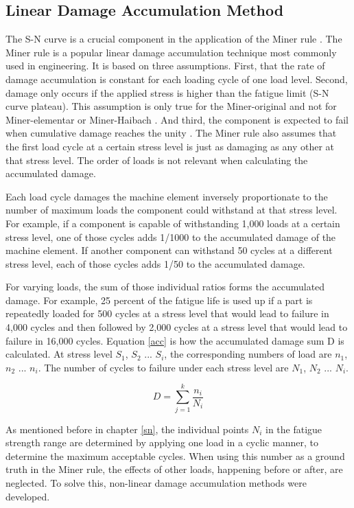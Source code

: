 \subsection{Linear Damage Accumulation Method}\label{LAD}
The S-N curve is a crucial component in the application of the Miner rule \cite{MinerOG, Subramanyan}. The Miner rule is a popular linear damage accumulation technique most commonly used in engineering. It is based on three assumptions. First, that the rate of damage accumulation is constant for each loading cycle of one load level. Second, damage only occurs if the applied stress is higher than the fatigue limit (S-N curve plateau). This assumption is only true for the Miner-original and not for Miner-elementar or Miner-Haibach \cite{Werner}. And third, the component is expected to fail when cumulative damage reaches the unity \cite{Zuo}.
The Miner rule also assumes that the first load cycle at a certain stress level is just as damaging as any other at that stress level. The order of loads is not relevant when calculating the accumulated damage.

Each load cycle damages the machine element inversely proportionate to the number of maximum loads the component could withstand at that stress level. For example, if a component is capable of withstanding 1,000 loads at a certain stress level, one of those cycles adds 1/1000 to the accumulated damage of the machine element.
If another component can withstand 50 cycles at a different stress level, each of those cycles adds 1/50 to the accumulated damage.

For varying loads, the sum of those individual ratios forms the accumulated damage. 
For example, 25 percent of the fatigue life is used up if a part is repeatedly loaded for 500 cycles at a stress level that would lead to failure in 4,000 cycles and then followed by 2,000 cycles at a stress level that would lead to failure in 16,000 cycles.
Equation \ref{acc} is how the accumulated damage sum D is calculated. At stress level \(S_1\), \(S_2\) ... \(S_i\), the corresponding numbers of load are \(n_1\), \(n_2\) ... \(n_i\). The number of cycles to failure under each stress level are \(N_1\), \(N_2\) ... \(N_i\).

\begin{equation}\label{acc}
	D = \sum_{j=1}^{k}\frac{n_i}{N_i}
\end{equation}

As mentioned before in chapter \ref{sn}, the individual points \(N_i\) in the fatigue strength range are determined by applying one load in a cyclic manner, to determine the maximum acceptable cycles. When using this number as a ground truth in the Miner rule, the effects of other loads, happening before or after, are neglected. To solve this, non-linear damage accumulation methods were developed.

